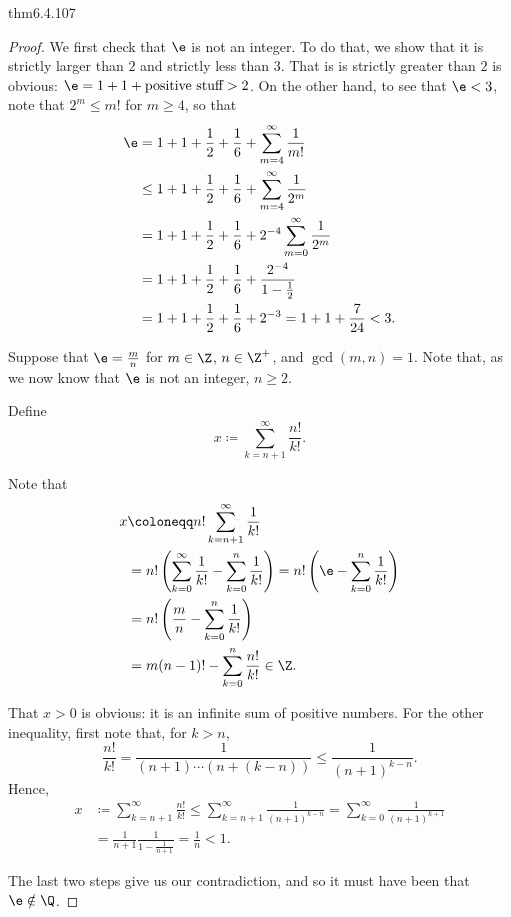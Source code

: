 \begin{thm}{}{thm6.4.107}
\begin{proof}
We first check that $\e$ is not an integer.  To do that, we show that it is strictly larger than $2$ and strictly less than $3$.  That is is strictly greater than $2$ is obvious:  $\e =1+1+\text{positive stuff}>2$.  On the other hand, to see that $\e <3$, note that $2^m\leq m!$ for $m\geq 4$, so that
\begin{equation}
\begin{split}
\e & =1+1+\frac{1}{2}+\frac{1}{6}+\sum _{m=4}^{\infty}\frac{1}{m!} \\
& \leq 1+1+\frac{1}{2}+\frac{1}{6}+\sum _{m=4}^{\infty}\frac{1}{2^m} \\
& =1+1+\frac{1}{2}+\frac{1}{6}+2^{-4}\sum _{m=0}^{\infty}\frac{1}{2^m} \\
& =1+1+\frac{1}{2}+\frac{1}{6}+\frac{2^{-4}}{1-\tfrac{1}{2}} \\
& =1+1+\frac{1}{2}+\frac{1}{6}+2^{-3}=1+1+\frac{7}{24}<3.
\end{split}
\end{equation}

Suppose that $\e =\frac{m}{n}$ for $m\in \Z$, $n\in \Z ^+$, and $\gcd (m,n)=1$.  Note that, as we now know that $\e$ is not an integer, $n\geq 2$.

Define
\begin{equation}
x\coloneqq \sum _{k=n+1}^{\infty}\frac{n!}{k!}.
\end{equation}

Note that
\begin{equation}
\begin{split}
x & \coloneqq n!\sum _{k=n+1}^{\infty}\frac{1}{k!} \\
& =n!\left( \sum _{k=0}^{\infty}\frac{1}{k!}-\sum _{k=0}^n\frac{1}{k!}\right) =n!\left( \e -\sum _{k=0}^n\frac{1}{k!}\right) \\
& =n!\left( \frac{m}{n}-\sum _{k=0}^n\frac{1}{k!}\right) \\
& =m(n-1)!-\sum _{k=0}^n\frac{n!}{k!}\in \Z .
\end{split}
\end{equation}

That $x>0$ is obvious:  it is an infinite sum of positive numbers.  For the other inequality, first note that, for $k>n$,
\begin{equation}
\frac{n!}{k!}=\frac{1}{(n+1)\cdots (n+(k-n))}\leq \frac{1}{(n+1)^{k-n}}.
\end{equation}
Hence,
\begin{equation}
\begin{split}
x & \coloneqq \sum _{k=n+1}^{\infty}\frac{n!}{k!}\leq \sum _{k=n+1}^{\infty}\frac{1}{(n+1)^{k-n}}=\sum _{k=0}^{\infty}\frac{1}{(n+1)^{k+1}} \\
& =\frac{1}{n+1}\frac{1}{1-\tfrac{1}{n+1}}=\frac{1}{n}<1.
\end{split}
\end{equation}

The last two steps give us our contradiction, and so it must have been that $\e \notin \Q$.
\end{proof}
\end{thm}

